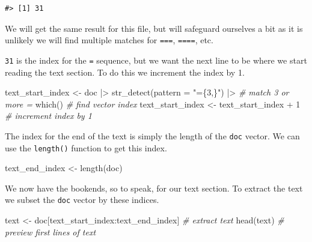 \documentclass[
  letterpaper,
]{latex/krantz}
\newenvironment{Shaded}{\begin{snugshade}}{\end{snugshade}}
\newcommand{\AttributeTok}[1]{\textcolor[rgb]{0.00,0.00,0.00}{#1}}
\newcommand{\CommentTok}[1]{\textcolor[rgb]{0.00,0.00,0.00}{\textit{#1}}}
\newcommand{\DecValTok}[1]{\textcolor[rgb]{0.00,0.00,0.00}{#1}}
\newcommand{\FunctionTok}[1]{\textcolor[rgb]{0.00,0.00,0.00}{#1}}
\newcommand{\NormalTok}[1]{\textcolor[rgb]{0.00,0.00,0.00}{#1}}
\newcommand{\OtherTok}[1]{\textcolor[rgb]{0.00,0.00,0.00}{#1}}
\newcommand{\SpecialCharTok}[1]{\textcolor[rgb]{0.00,0.00,0.00}{#1}}
\newcommand{\StringTok}[1]{\textcolor[rgb]{0.00,0.00,0.00}{#1}}
\begin{document}
\begin{verbatim}
#> [1] 31
\end{verbatim}

We will get the same result for this file, but will safeguard ourselves
a bit as it is unlikely we will find multiple matches for \texttt{===},
\texttt{====}, etc.

\texttt{31} is the index for the \texttt{=} sequence, but we want the
next line to be where we start reading the text section. To do this we
increment the index by 1.

\begin{Shaded}
\begin{Highlighting}[]
\NormalTok{text\_start\_index }\OtherTok{\textless{}{-}} 
\NormalTok{  doc }\SpecialCharTok{|\textgreater{}} 
  \FunctionTok{str\_detect}\NormalTok{(}\AttributeTok{pattern =} \StringTok{"=\{3,\}"}\NormalTok{) }\SpecialCharTok{|\textgreater{}} \CommentTok{\# match 3 or more \textasciigrave{}=\textasciigrave{} }
  \FunctionTok{which}\NormalTok{() }\CommentTok{\# find vector index}
\NormalTok{text\_start\_index }\OtherTok{\textless{}{-}}\NormalTok{ text\_start\_index }\SpecialCharTok{+} \DecValTok{1} \CommentTok{\# increment index by 1}
\end{Highlighting}
\end{Shaded}

The index for the end of the text is simply the length of the
\texttt{doc} vector. We can use the \texttt{length()} function to get
this index.

\begin{Shaded}
\begin{Highlighting}[]
\NormalTok{text\_end\_index }\OtherTok{\textless{}{-}} \FunctionTok{length}\NormalTok{(doc)}
\end{Highlighting}
\end{Shaded}

We now have the bookends, so to speak, for our text section. To extract
the text we subset the \texttt{doc} vector by these indices.

\begin{Shaded}
\begin{Highlighting}[]
\NormalTok{text }\OtherTok{\textless{}{-}}\NormalTok{ doc[text\_start\_index}\SpecialCharTok{:}\NormalTok{text\_end\_index] }\CommentTok{\# extract text}
\FunctionTok{head}\NormalTok{(text) }\CommentTok{\# preview first lines of \textasciigrave{}text\textasciigrave{}}
\end{Highlighting}
\end{Shaded}
\end{document}

